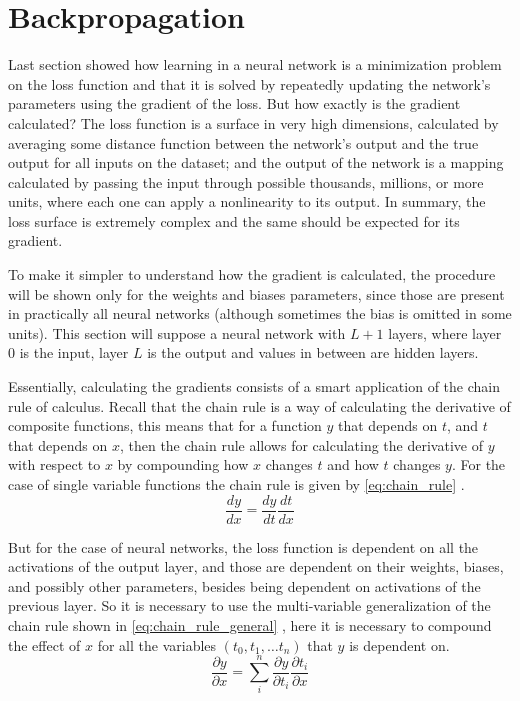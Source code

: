 \section{Backpropagation} \label{sec:backpropagation}
Last section showed how learning in a neural network is a minimization problem on the loss function and that it is solved by repeatedly updating the network's parameters using the gradient of the loss. But how exactly is the gradient calculated? The loss function is a surface in very high dimensions, calculated by averaging some distance function between the network's output and the true output for all inputs on the dataset; and the output of the network is a mapping calculated by passing the input through possible thousands, millions, or more units, where each one can apply a nonlinearity to its output. In summary, the loss surface is extremely complex and the same should be expected for its gradient.

To make it simpler to understand how the gradient is calculated, the procedure will be shown only for the weights and biases parameters, since those are present in practically all neural networks (although sometimes the bias is omitted in some units). This section will suppose a neural network with $L+1$ layers, where layer $0$ is the input, layer $L$ is the output and values in between are hidden layers.

Essentially, calculating the gradients consists of a smart application of the chain rule of calculus. Recall that the chain rule is a way of calculating the derivative of composite functions, this means that for a function $y$ that depends on $t$, and $t$ that depends on $x$, then the chain rule allows for calculating the derivative of $y$ with respect to $x$ by compounding how $x$ changes $t$ and how $t$ changes $y$. For the case of single variable functions the chain rule is given by \autoref{eq:chain_rule} \cite[p. 406]{calculusIII2016}.
\begin{equation} \label{eq:chain_rule}
    \frac{dy}{dx} = \frac{dy}{dt} \frac{dt}{dx}
\end{equation}

But for the case of neural networks, the loss function is dependent on all the activations of the output layer, and those are dependent on their weights, biases, and possibly other parameters, besides being dependent on activations of the previous layer. So it is necessary to use the multi-variable generalization of the chain rule shown in \autoref{eq:chain_rule_general} \cite[p. 412]{calculusIII2016}, here it is necessary to compound the effect of $x$ for all the variables $(t_0, t_1, \dots t_n)$ that $y$ is dependent on.
\begin{equation} \label{eq:chain_rule_general}
    \frac{\partial y}{\partial x} = \sum_{i}^{n}{\frac{\partial y}{\partial t_i} \frac{\partial t_i}{\partial x}}
\end{equation}

